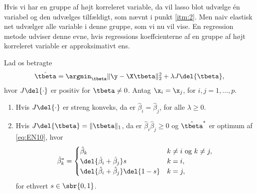 %
Hvis vi har en gruppe af højt korreleret variable, da vil lasso blot udvælge én variabel og den udvælges tilfældigt, som nævnt i punkt \ref{itm:2}.
Men naiv elastisk net udvælger alle variable i denne gruppe, som vi nu vil vise. 
En regression metode udviser denne evne, hvis regressions koeffcienterne af en gruppe af højt korreleret variable er approksimativt ens.
%
\begin{lem} \label{lem:elastisk_net2}
Lad os betragte
\begin{align}
\hat{\tbeta} = \argmin_{\tbeta} \Vert \y - \X \tbeta \Vert_2^2 + \lambda J \del{\tbeta}, \label{eq:EN10}
\end{align}
hvor \(J \del{\cdot}\) er positiv for \(\tbeta \neq 0\).
Antag \(\x_i = \x_j\), for \(i, j = 1, \ldots, p\).
\begin{enumerate}[label=\alph*)]
\item Hvis \(J \del{\cdot}\) er streng konveks, da er \(\hat{\beta}_i = \hat{\beta}_j\), for alle \(\lambda \geq 0\).
\item Hvis \(J \del{\tbeta} = \Vert \tbeta \Vert_1\), da er \(\hat{\beta}_i \hat{\beta}_j \geq 0\) og \(\hat{\tbeta}^*\) er optimum af \eqref{eq:EN10}, hvor
\begin{align*}
\hat{\beta}_k^* = \begin{cases}
\hat{\beta}_k & k \neq i \text{ og } k \neq j, \\
\del{\hat{\beta}_i + \hat{\beta}_j} s & k = i, \\
\del{\hat{\beta}_i + \hat{\beta}_j} \del{1-s} & k = j,
\end{cases}
\end{align*}
for ethvert \(s \in \sbr{0,1}\).
\end{enumerate}
\end{lem}
%
